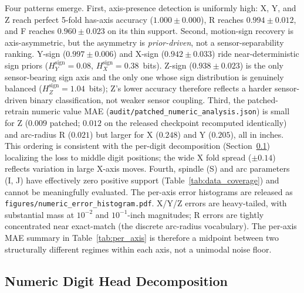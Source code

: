 \documentclass[sensors,article,submit,moreauthors,pdftex]{Definitions/mdpi}
\begin{document}
Four patterns emerge. First, axis-presence detection is uniformly high: X, Y, and Z reach perfect 5-fold has-axis accuracy ($1.000 \pm 0.000$), R reaches $0.994 \pm 0.012$, and F reaches $0.960 \pm 0.023$ on its thin support. Second, motion-sign recovery is axis-asymmetric, but the asymmetry is \emph{prior-driven}, not a sensor-separability ranking. Y-sign ($0.997 \pm 0.006$) and X-sign ($0.942 \pm 0.033$) ride near-deterministic sign priors ($H_{Y}^{\text{sign}}\!=\!0.08$, $H_{X}^{\text{sign}}\!=\!0.38$~bits). Z-sign ($0.938 \pm 0.023$) is the only sensor-bearing sign axis and the only one whose sign distribution is genuinely balanced ($H_{Z}^{\text{sign}}\!=\!1.04$~bits); Z's lower accuracy therefore reflects a harder sensor-driven binary classification, not weaker sensor coupling. Third, the patched-retrain numeric value MAE (\texttt{audit/patched\_numeric\_analysis.json}) is small for Z ($0.009$ patched; $0.012$ on the released checkpoint recomputed identically) and arc-radius R ($0.021$) but larger for X ($0.248$) and Y ($0.205$), all in inches. This ordering is consistent with the per-digit decomposition (Section~\ref{sec:numeric-decomposition}) localizing the loss to middle digit positions; the wide X fold spread ($\pm 0.14$) reflects variation in large X-axis moves. Fourth, spindle (S) and arc parameters (I, J) have effectively zero positive support (Table~\ref{tab:data_coverage}) and cannot be meaningfully evaluated. The per-axis error histograms are released as \texttt{figures/numeric\_error\_histogram.pdf}. X/Y/Z errors are heavy-tailed, with substantial mass at $10^{-2}$ and $10^{-1}$-inch magnitudes; R errors are tightly concentrated near exact-match (the discrete arc-radius vocabulary). The per-axis MAE summary in Table~\ref{tab:per_axis} is therefore a midpoint between two structurally different regimes within each axis, not a unimodal noise floor.

\subsection{Numeric Digit Head Decomposition}
\label{sec:numeric-decomposition}
\end{document}
